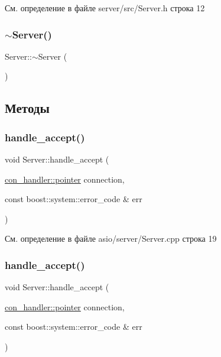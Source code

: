 См. определение в файле server/src/\+Server.\+h строка 12

\mbox{\label{class_server_a4b3aa2579cb1c8cd1d069582c14d0fa6}} 
\subsubsection{\texorpdfstring{$\sim$Server()}{~Server()}\hspace{0.1cm}{\footnotesize\ttfamily [2/2]}}
{\footnotesize\ttfamily Server\+::$\sim$\+Server (\begin{DoxyParamCaption}{ }\end{DoxyParamCaption})}



\subsection{Методы}
\mbox{\label{class_server_adb53e5d1b7c0ad8a79ce236c8ca5d50c}} 
\subsubsection{\texorpdfstring{handle\_accept()}{handle\_accept()}\hspace{0.1cm}{\footnotesize\ttfamily [1/2]}}
{\footnotesize\ttfamily void Server\+::handle\+\_\+accept (\begin{DoxyParamCaption}\item[{\mbox{\hyperlink{classcon__handler_ada4a1b970f9fd8e55460a58cf7f7ce2c}{con\+\_\+handler\+::pointer}}}]{connection,  }\item[{const boost\+::system\+::error\+\_\+code \&}]{err }\end{DoxyParamCaption})}



См. определение в файле asio/server/\+Server.\+cpp строка 19

\mbox{\label{class_server_adb53e5d1b7c0ad8a79ce236c8ca5d50c}} 
\subsubsection{\texorpdfstring{handle\_accept()}{handle\_accept()}\hspace{0.1cm}{\footnotesize\ttfamily [2/2]}}
{\footnotesize\ttfamily void Server\+::handle\+\_\+accept (\begin{DoxyParamCaption}\item[{\mbox{\hyperlink{classcon__handler_ada4a1b970f9fd8e55460a58cf7f7ce2c}{con\+\_\+handler\+::pointer}}}]{connection,  }\item[{const boost\+::system\+::error\+\_\+code \&}]{err }\end{DoxyParamCaption})}



